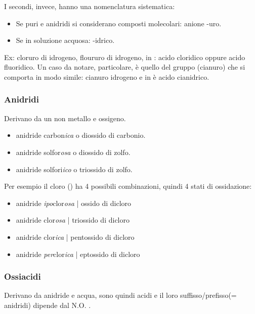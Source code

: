 I secondi, invece, hanno una nomenclatura sistematica: 
\begin{itemize}
    \item Se puri e anidridi si considerano composti molecolari: anione -uro.
    \item Se in soluzione acquosa: -idrico.
\end{itemize}

Ex:  cloruro di idrogeno,  floururo di idrogeno, in : acido cloridico oppure acido fluoridico.
Un caso da notare, particolare, è quello del gruppo  (cianuro) che si comporta in modo simile:  cianuro idrogeno e in  è acido cianidrico.


\subsubsection{Anidridi}
Derivano da un non metallo e ossigeno. 

\begin{itemize}
    \item {} anidride carbon\emph{ica} o diossido di carbonio.
    \item {} anidride solfor\emph{osa} o diossido di zolfo.
    \item {} anidride solfori\emph{ico} o triossido di zolfo.
\end{itemize}

Per esempio il cloro () ha 4 possibili combinazioni, quindi 4 stati di ossidazione: 
\begin{itemize}
    \item {} anidride \emph{ipo}clor\emph{osa} | ossido di dicloro
    \item {} anidride clor\emph{osa} | triossido di dicloro
    \item {} anidride clor\emph{ica} | pentossido di dicloro
    \item {} anidride \emph{per}clor\emph{ica} | eptossido di dicloro
\end{itemize}

\subsubsection{Ossiacidi}
Derivano da anidride e acqua, sono quindi acidi e il loro suffisso/prefisso(= anidridi) dipende dal N.O. . 

